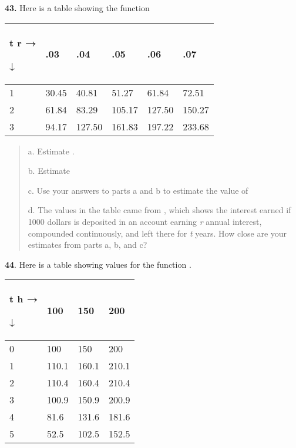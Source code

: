 \textbf{43.} Here is a table showing the function

\begin{longtable}[]{@{}llllll@{}}
\toprule
\begin{minipage}[b]{0.16\columnwidth}\raggedright\strut
t r →

↓\strut
\end{minipage} & \begin{minipage}[b]{0.16\columnwidth}\raggedright\strut
.03\strut
\end{minipage} & \begin{minipage}[b]{0.16\columnwidth}\raggedright\strut
.04\strut
\end{minipage} & \begin{minipage}[b]{0.16\columnwidth}\raggedright\strut
.05\strut
\end{minipage} & \begin{minipage}[b]{0.16\columnwidth}\raggedright\strut
.06\strut
\end{minipage} & \begin{minipage}[b]{0.16\columnwidth}\raggedright\strut
.07\strut
\end{minipage}\tabularnewline
\midrule
\endhead
1 & 30.45 & 40.81 & 51.27 & 61.84 & 72.51\tabularnewline
2 & 61.84 & 83.29 & 105.17 & 127.50 & 150.27\tabularnewline
3 & 94.17 & 127.50 & 161.83 & 197.22 & 233.68\tabularnewline
\bottomrule
\end{longtable}

\begin{quote}
a. Estimate .

b. Estimate

c. Use your answers to parts a and b to estimate the value of

d. The values in the table came from , which shows the interest earned
if 1000 dollars is deposited in an account earning \emph{r} annual
interest, compounded continuously, and left there for \emph{t} years.
How close are your estimates from parts a, b, and c?
\end{quote}

\textbf{44}. Here is a table showing values for the function .

\begin{longtable}[]{@{}llll@{}}
\toprule
\begin{minipage}[b]{0.24\columnwidth}\raggedright\strut
t h →

↓\strut
\end{minipage} & \begin{minipage}[b]{0.24\columnwidth}\raggedright\strut
100\strut
\end{minipage} & \begin{minipage}[b]{0.24\columnwidth}\raggedright\strut
150\strut
\end{minipage} & \begin{minipage}[b]{0.24\columnwidth}\raggedright\strut
200\strut
\end{minipage}\tabularnewline
\midrule
\endhead
0 & 100 & 150 & 200\tabularnewline
1 & 110.1 & 160.1 & 210.1\tabularnewline
2 & 110.4 & 160.4 & 210.4\tabularnewline
3 & 100.9 & 150.9 & 200.9\tabularnewline
4 & 81.6 & 131.6 & 181.6\tabularnewline
5 & 52.5 & 102.5 & 152.5\tabularnewline
\bottomrule
\end{longtable}

